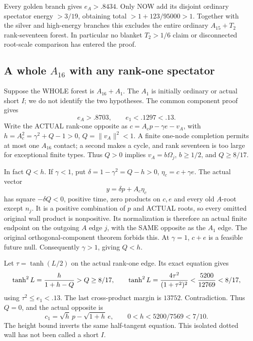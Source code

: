 \documentclass[11pt]{article}
\begin{document}
Every golden branch gives \(e_A>.8434\).
Only NOW add its disjoint ordinary spectator
energy \(>3/19\), obtaining total
\(>1+123/95000>1\).
Together with the silver and high-energy
branches this excludes the entire ordinary
\(A_{15}+T_2\) rank-seventeen forest.
In particular no blanket \(T_2>1/6\)
claim or disconnected root-scale comparison
has entered the proof.

\subsection{A whole \(A_{16}\) with any rank-one spectator}
\label{app:arithA16rankone}

Suppose the WHOLE forest is \(A_{16}+A_1\).
The \(A_1\) is initially ordinary or
actual short \(I\); we do not identify
the two hypotheses.
The common component proof gives
\[
                 e_A>.8703,\qquad e_1<.1297<.13 .
\]
Write the ACTUAL rank-one opposite as
\(c=A_cp-\gamma e-v_A\), with
\(h=A_c^2=\gamma^2+Q-1>0\),
\(Q=\|v_A\|^2<1\).
A finite one-node completion permits at
most one \(A_{16}\) contact; a second
makes a cycle, and rank seventeen is
too large for exceptional finite types.
Thus \(Q>0\) implies
\(v_A=b\Omega_j\), \(b\ge1/2\), and
\(Q\ge8/17\).

In fact \(Q<h\).
If \(\gamma<1\), put
\(\delta=1-\gamma^2=Q-h>0\),
\(\eta_c=c+\gamma e\).
The actual vector
\[
                         y=\delta p+A_c\eta_c
\]
has square \(-\delta Q<0\), positive
time, zero products on \(c,e\) and
every old \(A\)-root except \(n_j\).
It is a positive combination of \(p\)
and ACTUAL roots, so every omitted
original wall product is nonpositive.
Its normalization is therefore an actual
finite endpoint on the outgoing \(A\)
edge \(j\), with the SAME opposite
as the \(A_1\) edge.
The original orthogonal-component theorem
forbids this.
At \(\gamma=1\), \(c+e\) is a feasible
future null.
Consequently \(\gamma>1\), giving \(Q<h\).

Let \(\tau=\tanh(L/2)\) on the actual
rank-one edge.
Its exact equation gives
\[
 \tanh^2L={h\over1+h-Q}>Q\ge8/17,
 \qquad
 \tanh^2L={4\tau^2\over(1+\tau^2)^2}
                       <{5200\over12769}<8/17 ,
\]
using \(\tau^2\le e_1<.13\).
The last cross-product margin is \(13752\).
Contradiction.
Thus \(Q=0\), and the actual opposite is
\[
                   c_1=\sqrt h\,p-\sqrt{1+h}\,e,\qquad
                    0<h<5200/7569<7/10 .
\tag{A16r1}\label{eq:arithA16rankoneisolated}
\]
The height bound inverts the same
half-tangent equation.
This isolated dotted wall has not been
called a short \(I\).
\end{document}
